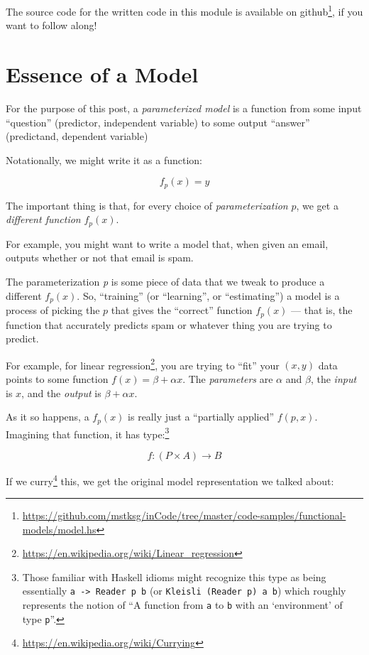 \documentclass[]{article}
\renewcommand{\href}[2]{#2\footnote{\url{#1}}}
\begin{document}
The source code for the written code in this module is available
\href{https://github.com/mstksg/inCode/tree/master/code-samples/functional-models/model.hs}{on
github}, if you want to follow along!

\section{Essence of a Model}\label{essence-of-a-model}

For the purpose of this post, a \emph{parameterized model} is a function from
some input ``question'' (predictor, independent variable) to some output
``answer'' (predictand, dependent variable)

Notationally, we might write it as a function:

\[
f_p(x) = y
\]

The important thing is that, for every choice of \emph{parameterization} \(p\),
we get a \emph{different function} \(f_p(x)\).

For example, you might want to write a model that, when given an email, outputs
whether or not that email is spam.

The parameterization \emph{p} is some piece of data that we tweak to produce a
different \(f_p(x)\). So, ``training'' (or ``learning'', or ``estimating'') a
model is a process of picking the \(p\) that gives the ``correct'' function
\(f_p(x)\) --- that is, the function that accurately predicts spam or whatever
thing you are trying to predict.

For example, for \href{https://en.wikipedia.org/wiki/Linear_regression}{linear
regression}, you are trying to ``fit'' your \((x, y)\) data points to some
function \(f(x) = \beta + \alpha x\). The \emph{parameters} are \(\alpha\) and
\(\beta\), the \emph{input} is \(x\), and the \emph{output} is \(\beta + \alpha
x\).

As it so happens, a \(f_p(x)\) is really just a ``partially applied''
\(f(p,x)\). Imagining that function, it has type:\footnote{Those familiar with
  Haskell idioms might recognize this type as being essentially
  \texttt{a\ -\textgreater{}\ Reader\ p\ b} (or
  \texttt{Kleisli\ (Reader\ p)\ a\ b}) which roughly represents the notion of
  ``A function from \texttt{a} to \texttt{b} with an `environment' of type
  \texttt{p}''.}

\[
f : (P \times A) \rightarrow B
\]

If we \href{https://en.wikipedia.org/wiki/Currying}{curry} this, we get the
original model representation we talked about:
\end{document}
